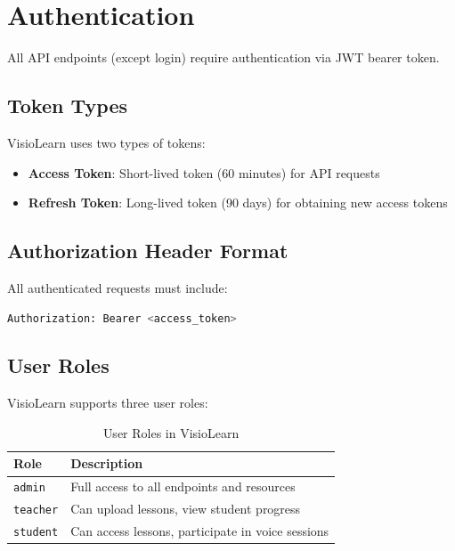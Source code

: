 \documentclass[12pt,a4paper,oneside]{article}
\begin{document}
\section{Authentication}

All API endpoints (except login) require authentication via JWT bearer token.

\subsection{Token Types}

VisioLearn uses two types of tokens:

\begin{itemize}
    \item \textbf{Access Token}: Short-lived token (60 minutes) for API requests
    \item \textbf{Refresh Token}: Long-lived token (90 days) for obtaining new access tokens
\end{itemize}

\subsection{Authorization Header Format}

All authenticated requests must include:

\begin{lstlisting}[language=bash]
Authorization: Bearer <access_token>
\end{lstlisting}

\subsection{User Roles}

VisioLearn supports three user roles:

\begin{table}[H]
\centering
\begin{tabular}{|l|l|}
\hline
\textbf{Role} & \textbf{Description} \\
\hline
\texttt{admin} & Full access to all endpoints and resources \\
\hline
\texttt{teacher} & Can upload lessons, view student progress \\
\hline
\texttt{student} & Can access lessons, participate in voice sessions \\
\hline
\end{tabular}
\caption{User Roles in VisioLearn}
\end{table}
\end{document}
